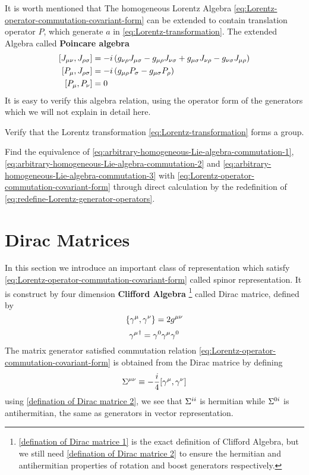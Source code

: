 It is worth mentioned that The homogeneous Lorentz Algebra \eqref{eq:Lorentz-operator-commutation-covariant-form} 
can be extended to contain translation operator $P$, which generate $a$ in \eqref{eq:Lorentz-transformation}. The extended Algebra called \textbf{Poincare algebra}
\begin{align}\label{Poincare Algebra}
	\comm{J_{\mu\nu}}{J_{\rh\s}} 
	&=
	-i \, (  g_{\n\rh}J_{\m\s} - g_{\m\rh}J_{\n\s}
	+ g_{\m\s}J_{\n\rh} - g_{\n\s}J_{\m\rh})\notag\\
	\comm{P_{\m}}{J_{\rh\s}}
	&=
	-i \,(g_{\m\rh}P_{\s}-g_{\m\s}P_{\rh})\\
	\comm{P_{\m}}{P_{\n}} &= 0\notag
\end{align}
It is easy to verify this algebra relation, using the operator form of the generators which we will not explain in detail here.
\begin{Exe}
  Verify that the Lorentz transformation \eqref{eq:Lorentz-transformation} forms a group.
\end{Exe}

\begin{Exe}
  Find the equivalence of \eqref{eq:arbitrary-homogeneous-Lie-algebra-commutation-1}, \eqref{eq:arbitrary-homogeneous-Lie-algebra-commutation-2} and \eqref{eq:arbitrary-homogeneous-Lie-algebra-commutation-3} with \eqref{eq:Lorentz-operator-commutation-covariant-form} through direct calculation by the redefinition of \eqref{eq:redefine-Lorentz-generator-operators}.
\end{Exe}

\section{Dirac Matrices}

In this section we introduce an important class of representation which satisfy
\eqref{eq:Lorentz-operator-commutation-covariant-form} called spinor representation.
It is construct by four dimension \textbf{Clifford Algebra}
\footnote{\eqref{defination of Dirac matrice 1} is the exact definition of Clifford Algebra, but we still need \eqref{defination of Dirac matrice 2} to ensure the hermitian and antihermitian properties of rotation and boost generators respectively. } called Dirac matrice, defined by
\begin{equation} \label{defination of Dirac matrice 1}
\acomm{\g^{\m}}{\g^{\n}} = 2g^{\m\n}
\end{equation}
\begin{equation} \label{defination of Dirac matrice 2}
{\gamma^{\mu}}^{\dagger} = \gamma^0\gamma^{\mu}\gamma^0
\end{equation}
The matrix generator satisfied commutation relation \eqref{eq:Lorentz-operator-commutation-covariant-form} is obtained from the Dirac matrice by defining
\begin{equation} \label{definition of generators in Dirac representation}
\Si^{\m\n}\equiv -\frac{i}{4}\comm{\g^{\m}}{\g^{\n}}
\end{equation}
using \eqref{defination of Dirac matrice 2}, we see that $\Sigma^{ii}$ is hermitian while $\Sigma^{0i}$ is antihermitian, the same as generators in vector representation.

